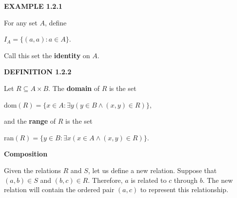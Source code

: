 \documentclass[12pt, a4paper]{article}
\begin{document}
\vspace{6mm}

\noindent\blacksquare\textbf{ EXAMPLE 1.2.1}\par

\vspace{4mm}

For any set $A$, define\par

\vspace{4mm}

\centerline{$I_A=\{(a,a)\colon a\in A\}$.}

\vspace{4mm}

Call this set the \textbf{identity} on $A$.\par

\vspace{6mm}

\noindent\blacksquare\textbf{ DEFINITION 1.2.2}\par

\vspace{4mm}

Let $R\subseteq A\times B$. The \textbf{domain} of $R$ is the set\par

\vspace{4mm}

\centerline{dom$(R)=\{x\in A\colon\exists y(y\in B\wedge(x,y)\in R)\}$,}

\vspace{4mm}

and the \textbf{range} of $R$ is the set\par

\vspace{4mm}

\centerline{ran$(R)=\{y\in B\colon\exists x(x\in A\wedge(x,y)\in R)\}$.}


\newpage

\noindent\large\textbf{Composition}\normalsize\par

\vspace{4mm}

\noindent Given the relations $R$ and $S$, let us define a new relation. Suppose that $(a,b)\in S$ and $(b,c)\in R$. Therefore, $a$ is related to $c$ through $b$. The new relation will contain the ordered pair $(a,c)$ to represent this relationship.\par

\vspace{6mm}
\end{document}
